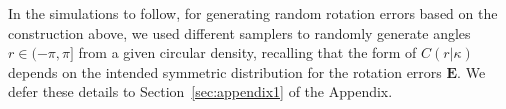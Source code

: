 In the simulations to follow, for generating random rotation errors based on the construction above, we used different samplers to randomly generate angles $r\in(-\pi,\pi]$ from a given circular density, recalling that the form of $C(r|\kappa)$ depends on the intended symmetric distribution for the rotation errors $\bm{E}$.  We defer these details to Section~\ref{sec:appendix1} of the Appendix.




